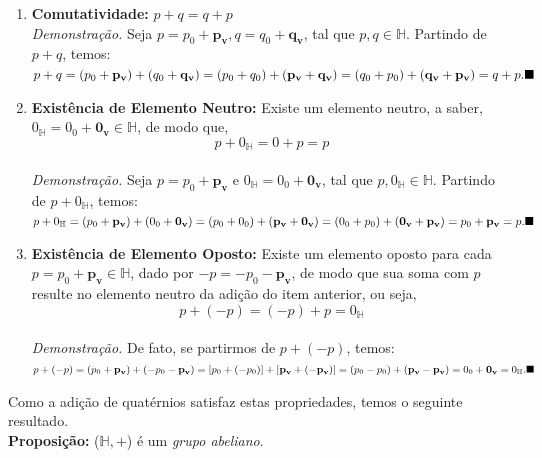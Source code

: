 \documentclass[a4paper,12pt]{article}
\begin{document}
\begin{itemize}
\begin{enumerate}
			\\ \item \textbf{Comutatividade:} $p+q=q+p$
			\\ \newline \textit{Demonstração.} Seja $p=p_0+\mathbf{p_v}, q=q_0+\mathbf{q_v}$,\,\,tal que $p,q \in \mathbb{H}$. Partindo de $p+q$, temos:
			\\ \newline $p+q=(p_0+\mathbf{p_v})+(q_0+\mathbf{q_v})=(p_0+q_0)+(\mathbf{p_v}+\mathbf{q_v})=(q_0+p_0)+(\mathbf{q_v}+\mathbf{p_v})=q+p.\hfill\blacksquare$
			\\ \item \textbf{Existência de Elemento Neutro:} Existe um elemento neutro, a saber, $0_{\mathbb{H}}=0_0+\mathbf{0_v} \in \mathbb{H}$, de modo que,
			\begin{equation}
			p+0_{\mathbb{H}}=0+p=p
			\end{equation}
			\\ \textit{Demonstração.}  Seja $p=p_0+\mathbf{p_v} \textrm{ e } 0_{\mathbb{H}}=0_0+\mathbf{0_v}$,\,\,tal que $p,0_{\mathbb{H}} \in \mathbb{H}$. Partindo de $p+0_{\mathbb{H}}$, temos:
			\\ \newline $p+0_{\mathbb{H}}=(p_0+\mathbf{p_v})+(0_0+\mathbf{0_v})=(p_0+0_0)+(\mathbf{p_v}+\mathbf{0_v})=(0_0+p_0)+(\mathbf{0_v}+\mathbf{p_v})=p_0+\mathbf{p_v}=p.\hfill\blacksquare$
			\\ \item \textbf{Existência de Elemento Oposto:} Existe um elemento oposto para cada $p=p_0+\mathbf{p_v} \in \mathbb{H}$, dado por $-p=-p_0-\mathbf{p_v}$, de modo que sua soma com $p$ resulte no elemento neutro da adição do item anterior, ou seja,
			\begin{equation}
			p+(-p)=(-p)+p=0_{\mathbb{H}}
			\end{equation}
			\\ \textit{Demonstração.} De fato, se partirmos de $p+(-p)$, temos:
			\\ \newline $p+(-p)= (p_0+\mathbf{p_v})+(-p_0-\mathbf{p_v})=[p_0+(-p_0)]+[\mathbf{p_v}+(\mathbf{-p_v})]=(p_0-p_0)+(\mathbf{p_v}-\mathbf{p_v})=0_0+\mathbf{0_v}=0_{\mathbb{H}}.\hfill\blacksquare$
		\end{enumerate}
		Como a adição de quatérnios satisfaz estas propriedades, temos o seguinte resultado.
		\\ \newline \textbf{Proposição: } ($\mathbb{H},+$) é um \textit{grupo abeliano}.
		\\
		

\end{itemize}
\end{document}
